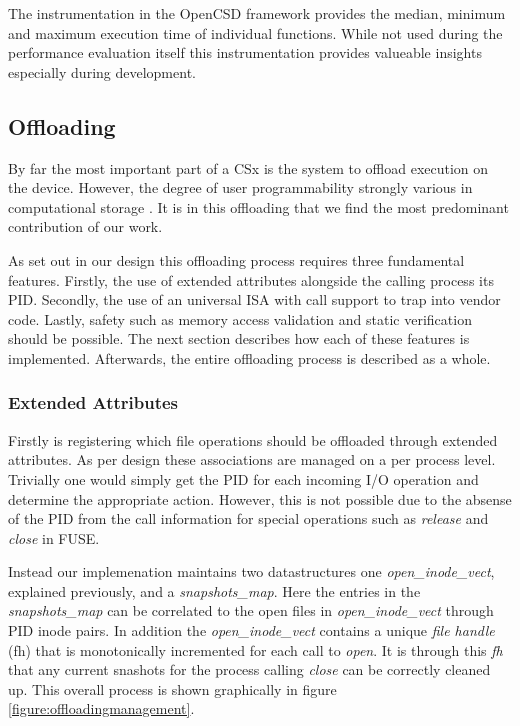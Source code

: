 The instrumentation in the OpenCSD framework provides the median, minimum and
maximum execution time of individual functions. While not used during the
performance evaluation itself this instrumentation provides valueable insights
especially during development.

\subsection{Offloading}

By far the most important part of a CSx is the system to offload execution on
the device. However, the degree of user programmability strongly various in
computational storage \cite{lukken2021past}. It is in this offloading that we
find the most predominant contribution of our work.

As set out in our design this offloading process requires three fundamental
features. Firstly, the use of extended attributes alongside the calling process
its PID. Secondly, the use of an universal ISA with call support to trap
into vendor code. Lastly, safety such as memory access validation and static
verification should be possible. The next section describes how each of these
features is implemented. Afterwards, the entire offloading process is described
as a whole.

\subsubsection{Extended Attributes}

Firstly is registering which file operations should be offloaded through
extended attributes. As per design these associations are managed on a per
process level. Trivially one would simply get the PID for each incoming I/O
operation and determine the appropriate action. However, this is not
possible due to the absense of the PID from the call information for special
operations such as \textit{release} and \textit{close} in FUSE. 

Instead our implemenation maintains two datastructures one 
\textit{open\_inode\_vect}, explained previously, and a \textit{snapshots\_map}.
Here the entries in the \textit{snapshots\_map} can be correlated to the open
files in \textit{open\_inode\_vect} through PID inode pairs. In addition the
\textit{open\_inode\_vect} contains a unique \textit{file handle} (fh) that is
monotonically incremented for each call to \textit{open}. It is through this
\textit{fh} that any current snashots for the process calling \textit{close}
can be correctly cleaned up. This overall process is shown graphically in
figure \ref{figure:offloadingmanagement}.

